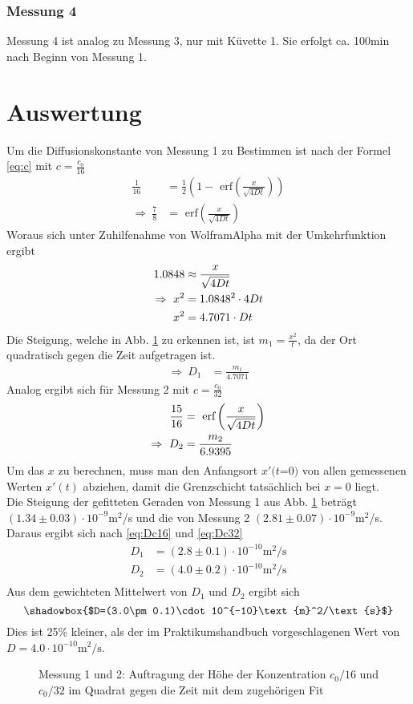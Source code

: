 \documentclass[12pt,a4paper,titlepage,headinclude,bibtotoc]{scrartcl}
\newcommand{\erf}[1]{\text{ erf}\ensuremath{\left( #1 \right)}}
\begin{document}
\subsubsection*{Messung 4}
Messung 4 ist analog zu Messung 3, nur mit Küvette 1.
Sie erfolgt ca. 100min nach Beginn von Messung 1.


\section{Auswertung}
\label{sec:auswertung}
Um die Diffusionskonstante von Messung 1 zu Bestimmen ist nach der Formel \eqref{eq:c} mit $c=\frac{c_0}{16}$
\begin{align*}
 \frac{1}{16}&=\frac{1}{2}\left(1-\erf{\frac{x}{\sqrt{4Dt}}}\right)\\
 \Rightarrow~ \frac{7}{8}&=\erf{\frac{x}{\sqrt{4Dt}}}
\end{align*}Woraus sich unter Zuhilfenahme von WolframAlpha\textsuperscript{\textregistered} mit der Umkehrfunktion ergibt
\begin{align*}
 1.0848&\approx \frac{x}{\sqrt{4Dt}}\notag\\
 \Rightarrow~ x^2&=1.0848^2 \cdot 4Dt\notag\\
 x^2&=4.7071\cdot Dt\notag
\end{align*}
Die Steigung, welche in Abb. \ref{fig:M12} zu erkennen ist, ist $m_1=\frac{x^2}{t}$, da der Ort quadratisch gegen die Zeit aufgetragen ist.
\begin{align}
\Rightarrow ~D_1&=\frac{m_1}{4.7071}\label{eq:Dc16}
\end{align}
Analog ergibt sich für Messung 2 mit $c=\frac{c_0}{32}$
\begin{align}
 \frac{15}{16}&=\erf{\frac{x}{\sqrt{4Dt}}}\notag\\
 \Rightarrow~ D_2&=\frac{m_2}{6.9395}\label{eq:Dc32}
\end{align}
Um das $x$ zu berechnen, muss man den Anfangsort $x'(t$=$0)$ von allen gemessenen Werten $x'(t)$ abziehen, damit die Grenzschicht tatsächlich bei $x=0$ liegt.\\  
Die Steigung der gefitteten Geraden von Messung 1 aus Abb. \ref{fig:M12} beträgt $(1.34\pm 0.03)\cdot 10^{-9}$m$^2$/s und die von Messung 2 $(2.81\pm 0.07)\cdot 10^{-9}$m$^2$/s.
Daraus ergibt sich nach \eqref{eq:Dc16} und \eqref{eq:Dc32}
\begin{align*}
 D_1&= (2.8\pm 0.1)\cdot 10^{-10}\text{m}^2/\text{s}\\
 D_2&= (4.0\pm 0.2)\cdot 10^{-10}\text{m}^2/\text{s}\\
\end{align*}
Aus dem gewichteten Mittelwert von $D_1$ und $D_2$ ergibt sich 
$$\shadowbox{$D=(3.0\pm 0.1)\cdot 10^{-10}\text{m}^2/\text{s}$}$$
 Dies ist 25\% kleiner, als der im Praktikumshandbuch vorgeschlagenen Wert von $D=4.0\cdot 10^{-10}\text{m}^2/\text{s}$.
\begin{figure}[!h]
\centering

\caption{Messung 1 und 2: Auftragung der Höhe der Konzentration $c_0/16$ und $c_0/32$ im Quadrat gegen die Zeit mit dem zugehörigen Fit\label{fig:M12}}
\end{figure}
\end{document}
